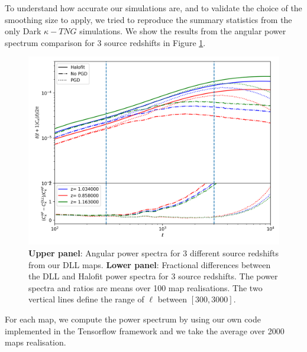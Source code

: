 \documentclass[twocolumn,twocolappendix]{aastex63}
\begin{document}
To understand how accurate our simulations are, and to validate the choice of the smoothing size to apply, we tried to reproduce the summary statistics from the only Dark $\kappa-TNG$ simulations. 
 We show the results from the angular power spectrum comparison for 3 source redshifts in Figure \ref{fig:ps_comp}.
\begin{figure}
    \centering
    \includegraphics[width=\columnwidth]{paper/figures/clshalofit_comp.png}
    \caption{
    \textbf{Upper panel}: Angular power spectra for 3 different source redshifts from
our DLL maps. \textbf{Lower panel}: Fractional differences between the
DLL and Halofit power spectra for 3 source redshifts. The power spectra and ratios are means over 100 map realisations. The two vertical lines define the range of $\ell$ between $[300,3000]$.}
    \label{fig:ps_comp}
\end{figure}

For each map, we compute the power spectrum by using our own code implemented in the Tensorflow framework and we take the average over 2000 maps realisation.
\end{document}
